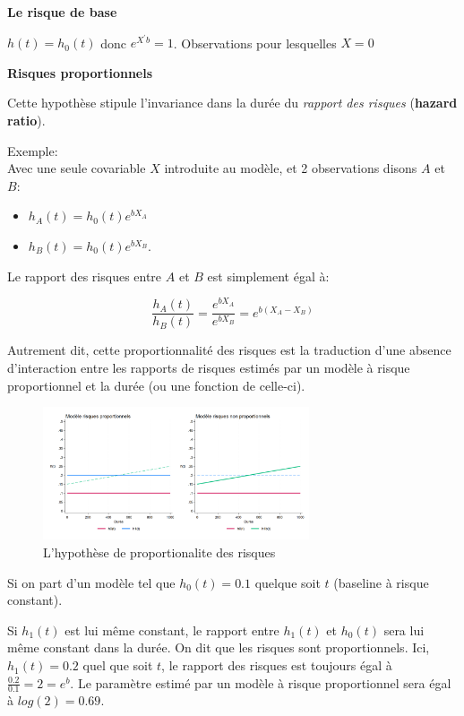 \documentclass[
  12pt,
  letterpaper,
  DIV=11,
  numbers=noendperiod,
  onepage,
  openany]{scrreprt}
\providecommand{\tightlist}{%
  \setlength{\itemsep}{0pt}\setlength{\parskip}{0pt}}\usepackage{longtable,booktabs,array}
\begin{document}
\textbf{Le risque de base}

\textbf{\(h(t)=h_0(t)\)} donc \textbf{\(e^{X^{'}b}=1\)}. Observations
pour lesquelles \(X=0\)

\textbf{Risques proportionnels}

Cette hypothèse stipule l'invariance dans la durée du \emph{rapport des
risques} (\textbf{hazard ratio}).

Exemple:\\
Avec une seule covariable \(X\) introduite au modèle, et 2 observations
disons \(A\) et \(B\):

\begin{itemize}
\tightlist
\item
  \(h_A(t)=h_0(t)e^{bX_{A}}\)
\item
  \(h_B(t)=h_0(t)e^{bX_{B}}\).
\end{itemize}

Le rapport des risques entre \(A\) et \(B\) est simplement égal à:

\[\frac{h_A(t)}{h_B(t)}= \frac{e^{bX_A}}{e^{bX_B}}=e^{b(X_A-X_B)}\]

Autrement dit, cette proportionnalité des risques est la traduction
d'une absence d'interaction entre les rapports de risques estimés par un
modèle à risque proportionnel et la durée (ou une fonction de celle-ci).

\begin{figure}

\caption{L'hypothèse de proportionalite des risques}

{\centering \includegraphics[width=0.7\textwidth,height=\textheight]{images/Image18.png}

}

\end{figure}

Si on part d'un modèle tel que \(h_0(t)=0.1\) quelque soit \(t\)
(baseline à risque constant).

Si \(h_1(t)\) est lui même constant, le rapport entre \(h_1(t)\) et
\(h_0(t)\) sera lui même constant dans la durée. On dit que les risques
sont proportionnels. Ici, \(h_1(t)=0.2\) quel que soit \(t\), le rapport
des risques est toujours égal à \(\frac{0.2}{0.1}=2=e^{b}\). Le
paramètre estimé par un modèle à risque proportionnel sera égal à
\(log(2)=0.69\).
\end{document}
